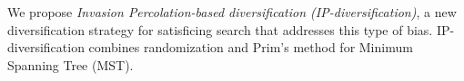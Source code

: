 We propose \;\emph{Invasion Percolation-based diversification (IP-diversification)}, a new diversification strategy for satisficing search that addresses this type of bias.
IP-diversification combines randomization and Prim's method \cite{prim1957shortest} for Minimum Spanning Tree (MST).
